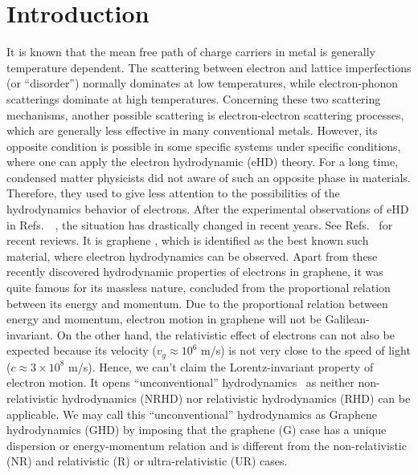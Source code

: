 \documentclass[amsmath,amssymb,aps,prb]{revtex4-2}
\begin{document}
%
\maketitle
%
\section{Introduction} 
    It is known that the mean free path of charge carriers in metal is generally temperature dependent. The scattering between electron and lattice imperfections (or “disorder”) normally dominates at low temperatures, while electron-phonon scatterings dominate at high temperatures. Concerning these two scattering mechanisms, another possible scattering is electron-electron scattering processes, which are generally less effective in many conventional metals. However, its opposite condition is possible in some specific systems under specific conditions, where one can apply the electron hydrodynamic (eHD) theory. For a long time, condensed matter physicists did not aware of such an opposite phase in materials. Therefore, they used to give less attention to the possibilities of the hydrodynamics behavior of electrons. After the experimental observations of eHD in Refs.~\cite{1Ku:2019lgj,2varnavides2020electron,3PhysRevB.103.125106,4PhysRevB.103.235152,5PhysRevB.103.155128,6PhysRevResearch.3.013290,7DiSante:2019zrd,8PhysRevB.103.115402,9sulpizio2019visualizing,10gallagher2019quantum,11doi:10.1126/science.aau0685,12ella2019simultaneous,13bandurin2018fluidity,18doi:10.1126/science.aad0201,14PhysRevB.98.241304,15jaoui2018departure,16doi:10.1126/science.aac8385,17doi:10.1126/science.aad0343}~, the situation has drastically changed in recent years. See Refs.~\cite{eHD1,eHD2,eHD3} for recent reviews. It is graphene \cite{1Ku:2019lgj,2varnavides2020electron,3PhysRevB.103.125106,4PhysRevB.103.235152,5PhysRevB.103.155128,6PhysRevResearch.3.013290,7DiSante:2019zrd,8PhysRevB.103.115402,9sulpizio2019visualizing,10gallagher2019quantum,11doi:10.1126/science.aau0685,12ella2019simultaneous,13bandurin2018fluidity,18doi:10.1126/science.aad0201}, which is identified as the best known such material, where electron hydrodynamics can be observed. Apart from these recently discovered hydrodynamic properties of electrons in graphene, it was quite famous for its massless nature, concluded from the proportional relation between its energy and momentum. Due to the proportional relation between energy and momentum, electron motion in graphene will not be Galilean-invariant. On the other hand, the relativistic effect of electrons can not also be expected because its velocity ($v_g\approx 10^6$ m/s) is not very close to the speed of light ($c\approx 3\times 10^8$ m/s). Hence, we can’t  claim the Lorentz-invariant property of electron motion. It opens “unconventional” hydrodynamics~\cite{eHD2} as neither non-relativistic hydrodynamics (NRHD) nor relativistic hydrodynamics (RHD) can be applicable. We may call this “unconventional” hydrodynamics as Graphene hydrodynamics (GHD) by imposing that the graphene (G) case has a unique dispersion or energy-momentum relation and is different from the non-relativistic (NR) and relativistic (R) or ultra-relativistic (UR) cases.
\end{document}
